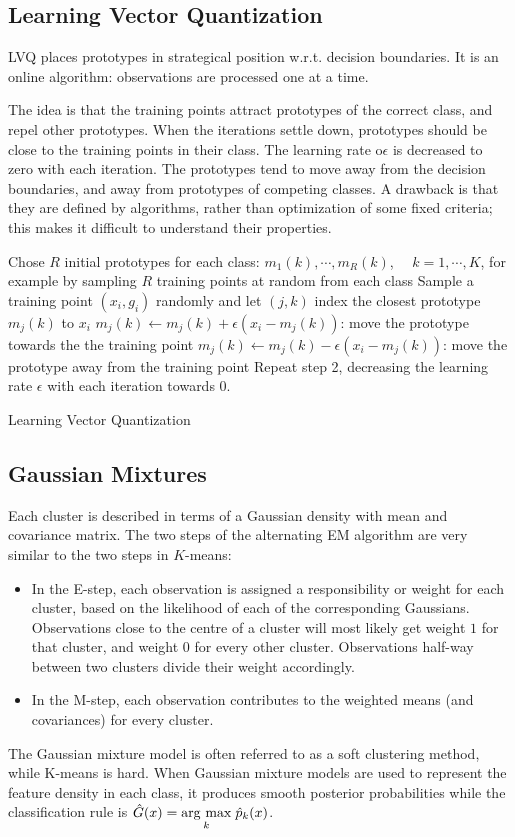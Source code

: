 \subsection{Learning Vector Quantization}
LVQ places prototypes in strategical position w.r.t. decision boundaries. It is an online algorithm: observations are processed one at a time.

The idea is that the training points attract prototypes of the correct class, and repel other prototypes. When the iterations settle down, prototypes should be close to the training points in their class. The learning rate o$\epsilon$ is decreased to zero with each iteration. The prototypes tend to move away from the decision boundaries, and away from prototypes of competing classes.
A drawback is that they are defined by algorithms, rather than optimization of some fixed
criteria; this makes it difficult to understand their properties.
\begin{algorithm}[H]
\SetAlgoLined
Chose $R$ initial prototypes for each class: $m_1(k),\cdots, m_R(k)$, $\quad k=1,\cdots, K$, for example by sampling $R$ training points at random from each class\;
Sample a training point $(x_i, g_i)$ randomly and let $(j,k)$ index the closest prototype $m_j(k)$ to $x_i$\;
{
	$m_j (k) \leftarrow m_j(k) + \epsilon(x_i-m_j(k))$: move the prototype towards the the training point\;
}
{
	$m_j (k) \leftarrow m_j(k) - \epsilon(x_i-m_j(k))$: move the prototype away from the training point\;
}
Repeat step 2, decreasing the learning rate $\epsilon$ with each iteration towards $0$.
\caption{Learning Vector Quantization}
\end{algorithm}


\subsection{Gaussian Mixtures}
Each cluster is described in terms of a Gaussian density with mean and covariance matrix. The two steps of the alternating EM algorithm are very similar to the two steps in $K$-means:
\begin{itemize}
\item In the E-step, each observation is assigned a responsibility or weight for each cluster, based on the likelihood of each of the corresponding Gaussians. Observations close to the centre of a cluster will most likely get weight $1$ for that cluster, and weight $0$ for every other cluster. Observations half-way between two clusters divide their weight accordingly.
\item In the M-step, each observation contributes to the weighted means (and covariances) for every cluster.
\end{itemize}
The Gaussian mixture model is often referred to as a soft clustering method, while K-means is hard. When Gaussian mixture models are used to represent the feature density in each class, it produces smooth posterior probabilities while the classification rule is $\hat{G}(x) = \underset{k}{\operatorname{arg}\,\operatorname{max}}\;{\hat{p}_k(x)}$.

